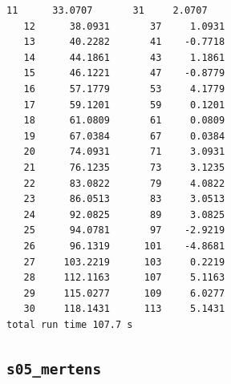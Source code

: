 \documentclass[11pt,reqno]{amsart}
\numberwithin{equation}{section}
\theoremstyle{plain}
\theoremstyle{definition}
\theoremstyle{remark}
\begin{document}
\begin{lstlisting}[style=out]
   11      33.0707       31     2.0707
   12      38.0931       37     1.0931
   13      40.2282       41    -0.7718
   14      44.1861       43     1.1861
   15      46.1221       47    -0.8779
   16      57.1779       53     4.1779
   17      59.1201       59     0.1201
   18      61.0809       61     0.0809
   19      67.0384       67     0.0384
   20      74.0931       71     3.0931
   21      76.1235       73     3.1235
   22      83.0822       79     4.0822
   23      86.0513       83     3.0513
   24      92.0825       89     3.0825
   25      94.0781       97    -2.9219
   26      96.1319      101    -4.8681
   27     103.2219      103     0.2219
   28     112.1163      107     5.1163
   29     115.0277      109     6.0277
   30     118.1431      113     5.1431
total run time 107.7 s
\end{lstlisting}

\subsection{\texttt{s05\_mertens}}
\label{app:out-s05-mertens}
\end{document}
